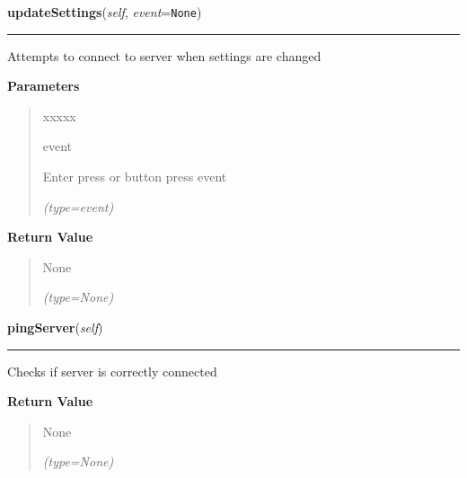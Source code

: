 \hspace{.8\funcindent}\begin{boxedminipage}{\funcwidth}

    \raggedright \textbf{updateSettings}(\textit{self}, \textit{event}={\tt None})

    \vspace{-1.5ex}

    \rule{\textwidth}{0.5\fboxrule}
\setlength{\parskip}{2ex}
    Attempts to connect to server when settings are changed

\setlength{\parskip}{1ex}
      \textbf{Parameters}
      \vspace{-1ex}

      \begin{quote}
        \begin{Ventry}{xxxxx}

          \item[event]

          Enter press or button press event

            {\it (type=event)}

        \end{Ventry}

      \end{quote}

      \textbf{Return Value}
    \vspace{-1ex}

      \begin{quote}
      None

      {\it (type=None)}

      \end{quote}

    \end{boxedminipage}

    \label{client_gui:GuiClass:pingServer}

    \vspace{0.5ex}

\hspace{.8\funcindent}\begin{boxedminipage}{\funcwidth}

    \raggedright \textbf{pingServer}(\textit{self})

    \vspace{-1.5ex}

    \rule{\textwidth}{0.5\fboxrule}
\setlength{\parskip}{2ex}
    Checks if server is correctly connected

\setlength{\parskip}{1ex}
      \textbf{Return Value}
    \vspace{-1ex}

      \begin{quote}
      None

      {\it (type=None)}

      \end{quote}

    \end{boxedminipage}

